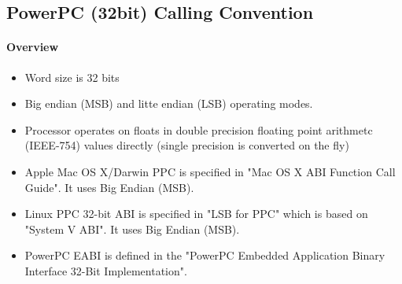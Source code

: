 %
%
%
%

\subsection{PowerPC (32bit) Calling Convention}

\paragraph{Overview}

\begin{itemize}
\item Word size is 32 bits
\item Big endian (MSB) and litte endian (LSB) operating modes.
\item Processor operates on floats in double precision floating point arithmetc (IEEE-754) values directly (single precision is converted on the fly)
\item Apple Mac OS X/Darwin PPC is specified in "Mac OS X ABI Function Call Guide"\cite{ppcMacOSX}. It uses Big Endian (MSB).
\item Linux PPC 32-bit ABI is specified in "LSB for PPC"\cite{ppc32LSB} which is based on "System V ABI". It uses Big Endian (MSB).
\item PowerPC EABI is defined in the "PowerPC Embedded Application Binary Interface 32-Bit Implementation".
\end{itemize}

